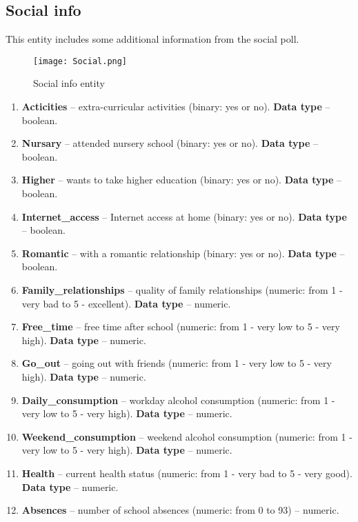 \subsection*{Social info}

This entity includes some additional information from the social poll.

\begin{figure}[H]
    \centering
    \texttt{[image: Social.png]}
    \caption{Social info entity}
\end{figure}

\begin{enumerate}
\item \textbf{Acticities} -- extra-curricular activities (binary: yes or no). \textbf{Data type} -- boolean.
\item \textbf{Nursary} -- attended nursery school (binary: yes or no). \textbf{Data type} -- boolean.
\item \textbf{Higher} -- wants to take higher education (binary: yes or no). \textbf{Data type} -- boolean.
\item \textbf{Internet\_access} -- Internet access at home (binary: yes or no). \textbf{Data type} -- boolean.
\item \textbf{Romantic} -- with a romantic relationship (binary: yes or no). \textbf{Data type} -- boolean.
\item \textbf{Family\_relationships} -- quality of family relationships (numeric: from 1 - very bad to 5 - excellent). \textbf{Data type} -- numeric.
\item \textbf{Free\_time} -- free time after school (numeric: from 1 - very low to 5 - very high). \textbf{Data type} -- numeric.
\item \textbf{Go\_out} -- going out with friends (numeric: from 1 - very low to 5 - very high). \textbf{Data type} -- numeric.
\item \textbf{Daily\_consumption} -- workday alcohol consumption (numeric: from 1 - very low to 5 - very high). \textbf{Data type} -- numeric.
\item \textbf{Weekend\_consumption} -- weekend alcohol consumption (numeric: from 1 - very low to 5 - very high). \textbf{Data type} -- numeric.
\item \textbf{Health} -- current health status (numeric: from 1 - very bad to 5 - very good). \textbf{Data type} -- numeric.
\item \textbf{Absences} -- number of school absences (numeric: from 0 to 93) -- numeric.
\end{enumerate}

